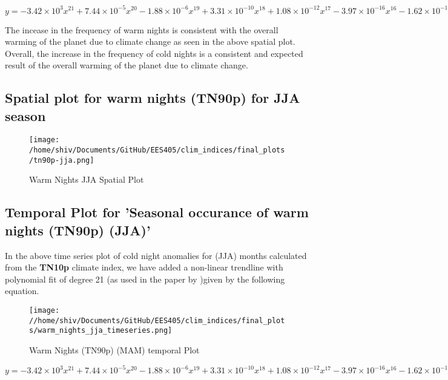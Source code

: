 \documentclass[a4paper, 12pt, twoside]{report}
\begin{document}
$ y = -3.42\times10^{3}x^{21}+7.44\times10^{-5}x^{20}-1.88\times10^{-6}x^{19}+3.31\times10^{-10}x^{18}+1.08\times10^{-12}x^{17}-3.97\times10^{-16}x^{16}-1.62\times10^{-19}x^{15}+1.05\times10^{-22}x^{14}-5.80\times10^{-27}x^{13}-8.00\times10^{-30}x^{12}+2.29\times10^{-33}x^{11}-1.20\times10^{-37}x^{10}-6.72\times10^{-41}x^{9}+1.99\times10^{-44}x^{8}-2.95\times10^{-48}x^{7}+2.85\times10^{-52}x^{6}-1.92\times10^{-56}x^{5}+9.12\times10^{-61}x^{4}-3.03\times10^{-65}x^{3}+6.69\times10^{-70}x^{2}-8.87\times10^{-75}x+5.34\times10^{-80}$

The incease in the frequency of warm nights is consistent with the overall warming of the planet due to climate change as seen in the above spatial plot.\\
Overall, the increase in the frequency of cold nights is a consistent and expected result of the overall warming of the planet due to climate change.


\subsection{Spatial plot for warm nights (TN90p) for JJA season}
\begin{figure}[htb]
    \centering
    \texttt{[image: /home/shiv/Documents/GitHub/EES405/clim\_indices/final\_plots/tn90p-jja.png]}
    \caption{Warm Nights JJA Spatial Plot}
    \label{fig:tn90p_jja_spatial}
\end{figure}

\subsection{Temporal Plot for 'Seasonal occurance of warm nights (TN90p) (JJA)'}
In the above time series plot of cold night anomalies for (JJA) months calculated from the \textbf{TN10p} climate index, we have added a non-linear trendline with polynomial fit of degree 21 (as used in the paper by )given by the following equation. \\
\begin{figure}[htb]
    \centering
    \texttt{[image: //home/shiv/Documents/GitHub/EES405/clim\_indices/final\_plots/warm\_nights\_jja\_timeseries.png]}
    \caption{Warm Nights (TN90p) (MAM) temporal Plot}
    \label{fig:tn90p_jja_temporal}
\end{figure}

$ y = -3.42\times10^{3}x^{21}+7.44\times10^{-5}x^{20}-1.88\times10^{-6}x^{19}+3.31\times10^{-10}x^{18}+1.08\times10^{-12}x^{17}-3.97\times10^{-16}x^{16}-1.62\times10^{-19}x^{15}+1.05\times10^{-22}x^{14}-5.80\times10^{-27}x^{13}-8.00\times10^{-30}x^{12}+2.29\times10^{-33}x^{11}-1.20\times10^{-37}x^{10}-6.72\times10^{-41}x^{9}+1.99\times10^{-44}x^{8}-2.95\times10^{-48}x^{7}+2.85\times10^{-52}x^{6}-1.92\times10^{-56}x^{5}+9.12\times10^{-61}x^{4}-3.03\times10^{-65}x^{3}+6.69\times10^{-70}x^{2}-8.87\times10^{-75}x+5.34\times10^{-80}$
\end{document}
